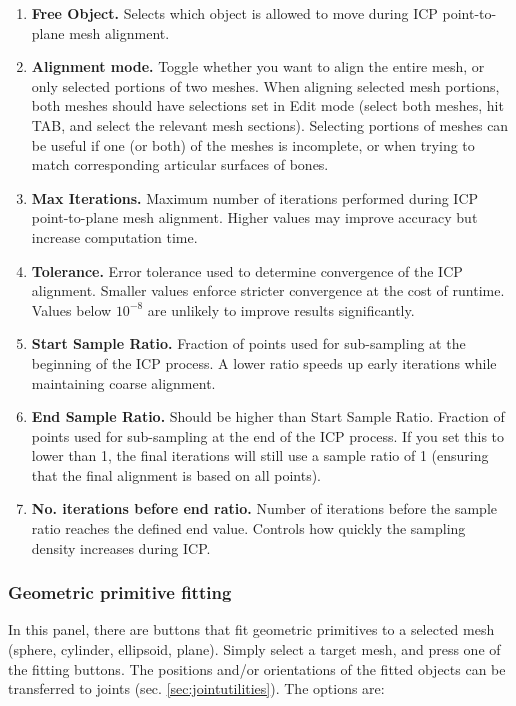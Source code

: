 \documentclass{article}
\begin{document}
\begin{enumerate}
    \item \textbf{Free Object.} Selects which object is allowed to move during ICP point-to-plane mesh alignment.
    
    \item \textbf{Alignment mode.} Toggle whether you want to align the entire mesh, or only selected portions of two meshes. When aligning selected mesh portions, both meshes should have selections set in Edit mode (select both meshes, hit TAB, and select the relevant mesh sections). Selecting portions of meshes can be useful if one (or both) of the meshes is incomplete, or when trying to match corresponding articular surfaces of bones.
    
    \item \textbf{Max Iterations.} Maximum number of iterations performed during ICP point-to-plane mesh alignment. Higher values may improve accuracy but increase computation time.
    
    \item \textbf{Tolerance.} Error tolerance used to determine convergence of the ICP alignment. Smaller values enforce stricter convergence at the cost of runtime. Values below $10^{-8}$ are unlikely to improve results significantly.
    
    \item \textbf{Start Sample Ratio.} Fraction of points used for sub-sampling at the beginning of the ICP process. A lower ratio speeds up early iterations while maintaining coarse alignment.
    
    \item \textbf{End Sample Ratio.} Should be higher than Start Sample Ratio. Fraction of points used for sub-sampling at the end of the ICP process. If you set this to lower than 1, the final iterations will still use a sample ratio of 1 (ensuring that the final alignment is based on all points).
    
    \item \textbf{No. iterations before end ratio.} Number of iterations before the sample ratio reaches the defined end value. Controls how quickly the sampling density increases during ICP.
\end{enumerate}

\subsubsection{Geometric primitive fitting}
\label{sec:primitivefitting}
In this panel, there are buttons that fit geometric primitives to a selected mesh (sphere, cylinder, ellipsoid, plane). Simply select a target mesh, and press one of the fitting buttons. The positions and/or orientations of the fitted objects can be transferred to joints (sec. \ref{sec:jointutilities}). The options are:
\end{document}

